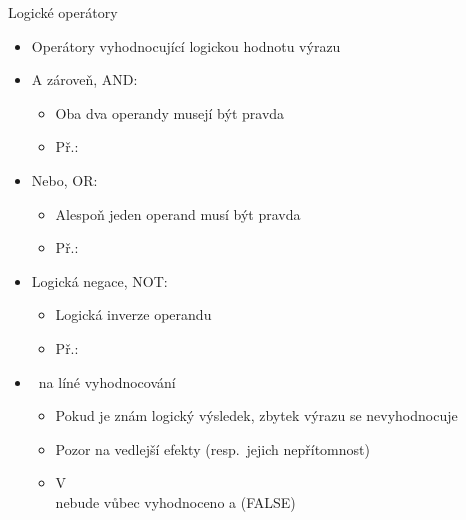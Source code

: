 \begin{frame}{Logické operátory}
  \begin{itemize}
    \item Operátory vyhodnocující logickou hodnotu výrazu

    \pause

    \item A zároveň, AND: \code{\&\&}
    \begin{itemize}
      \item Oba dva operandy musejí být pravda
      \item Př.: 
    \end{itemize}

    \pause

    \item Nebo, OR: \code{||}
    \begin{itemize}
      \item Alespoň jeden operand musí být pravda
      \item Př.: 
    \end{itemize}

    \pause

    \item Logická negace, NOT: \code{!}
    \begin{itemize}
      \item Logická inverze operandu
      \item Př.: 
    \end{itemize}

    \pause

    \item \pozor\ na líné vyhodnocování
    \begin{itemize}
      \item Pokud je znám logický výsledek, zbytek výrazu se nevyhodnocuje
      \item Pozor na vedlejší efekty (resp.\ jejich nepřítomnost)

      \pause

      \item V  \\
       nebude vůbec vyhodnoceno a  (FALSE)
    \end{itemize}

  \end{itemize}

\end{frame}

